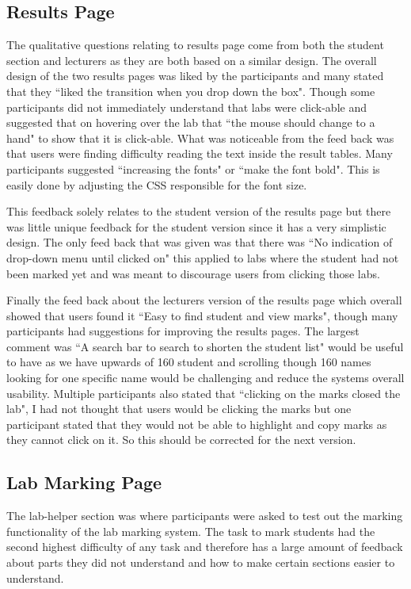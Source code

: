 \documentclass[11pt]{report}
\begin{document}
\subsection*{Results Page}

The qualitative questions relating to results page come from both the student section and lecturers as they are both based on a similar design. The overall design of the two results pages was liked by the participants and many stated that they ``liked the transition when you drop down the box". Though some participants did not immediately understand that labs were click-able and suggested that on hovering over the lab that ``the mouse should change to a hand"  to show that it is click-able. What was noticeable from the feed back was that users were finding difficulty reading the text inside the result tables. Many participants suggested ``increasing the fonts" or ``make the font bold". This is easily done by adjusting the CSS responsible for the font size. 

\noindent This feedback  solely relates to the student version of the results page but there was little unique feedback for the student version since it has a very simplistic design. The only feed back that was given was that there was ``No indication of drop-down menu until clicked on" this applied to labs where the student had not been marked yet and was meant to discourage users from clicking those labs.

\noindent Finally the feed back about the lecturers version of the results page which overall  showed that users found it ``Easy to find student and view marks", though many participants had suggestions for improving the results pages. The largest comment was ``A search bar to search to shorten the student list"  would be useful to have as we have upwards of 160 student and scrolling though 160 names looking for one specific name would be challenging and reduce the systems overall usability. Multiple participants also stated that ``clicking on the marks closed the lab", I had not thought that users would be clicking the marks but one participant stated that they would not be able to highlight and copy marks as they cannot click on it. So this should be corrected for the next version.



\subsection*{Lab Marking Page}

The lab-helper section was where participants were asked to test out the marking functionality of the lab marking system. The task to mark students had the second highest difficulty of any task and therefore has a large amount of feedback about parts they did not understand and how to make certain sections easier to understand. 
\end{document}
